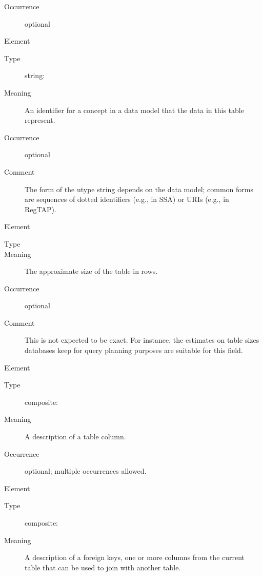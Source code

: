 \documentclass[11pt,a4paper]{ivoa}
\begin{document}
\begin{generated}
\begin{bigdescription}
\begin{description}
\item[Occurrence] optional

\end{description}
\item[Element \xmlel{utype}]
\begin{description}
\item[Type] string: 
\item[Meaning] 
                  An identifier for a concept in a data model that
                  the data in this table represent.  
               
\item[Occurrence] optional
\item[Comment] 
                  The form of the utype string depends on the data
                  model; common forms are sequences of dotted identifiers
                  (e.g., in SSA) or URIs (e.g., in RegTAP).
               

\end{description}
\item[Element \xmlel{nrows}]
\begin{description}
\item[Type] 
\item[Meaning] 
                  The approximate size of the table in rows.
               
\item[Occurrence] optional
\item[Comment] 
                  This is not expected to be exact.  For instance, the
                  estimates on table sizes databases keep for query
                  planning purposes are suitable for this field.
               

\end{description}
\item[Element \xmlel{column}]
\begin{description}
\item[Type] composite: 
\item[Meaning] 
                  A description of a table column.
               
\item[Occurrence] optional; multiple occurrences allowed.

\end{description}
\item[Element \xmlel{foreignKey}]
\begin{description}
\item[Type] composite: 
\item[Meaning] 
                  A description of a foreign keys, one or more columns
                  from the current table that can be used to join with 
                  another table.  
               

\end{description}
\end{bigdescription}
\end{generated}
\end{document}
